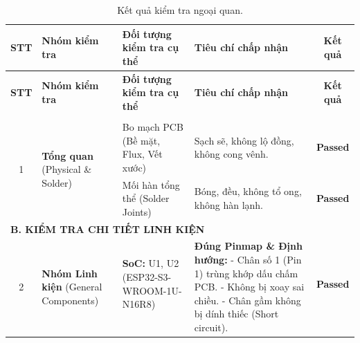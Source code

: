         \begin{longtable}{|c|p{2.5cm}|p{5cm}|p{4cm}|c|}
            \caption{Kết quả kiểm tra ngoại quan.}
            \label{tab:visual_inspection} \\
            \hline
            \textbf{STT} & \textbf{Nhóm kiểm tra} & \textbf{Đối tượng kiểm tra cụ thể} & \textbf{Tiêu chí chấp nhận} & \textbf{Kết quả} \\ \hline
            \endfirsthead
        
            \hline
            \textbf{STT} & \textbf{Nhóm kiểm tra} & \textbf{Đối tượng kiểm tra cụ thể} & \textbf{Tiêu chí chấp nhận} & \textbf{Kết quả} \\ \hline
            \endhead
        
            \hline
            \endfoot
            \endlastfoot
        
            \multicolumn{5}{|l|}{\textbf{A. KIỂM TRA TỔNG QUÁT}} \\ \hline
        
            \multirow{2}{*}{1} & \multirow{2}{3cm}{\textbf{Tổng quan} \newline (Physical \& Solder)}
                & Bo mạch PCB (Bề mặt, Flux, Vết xước) 
                & Sạch sẽ, không lộ đồng, không cong vênh. 
                & \textcolor{modern_blue}{\textbf{Passed}} \\ \cline{3-5}
        
                & & Mối hàn tổng thể (Solder Joints) 
                & Bóng, đều, không tổ ong, không hàn lạnh. 
                & \textcolor{modern_blue}{\textbf{Passed}} \\ \hline
        
            \multicolumn{5}{|l|}{\textbf{B. KIỂM TRA CHI TIẾT LINH KIỆN}} \\ \hline
        
            \multirow{15}{*}{2} & \multirow{15}{3cm}{\textbf{Nhóm Linh kiện} \newline (General Components)}
                & \textbf{SoC:} U1, U2 \newline (ESP32-S3-WROOM-1U-N16R8)
                & \multirow{15}{4cm}{\textbf{Đúng Pinmap \& Định hướng:} \newline - Chân số 1 (Pin 1) trùng khớp dấu chấm PCB. \newline - Không bị xoay sai chiều. \newline - Chân gầm không bị dính thiếc (Short circuit).}
                & \textcolor{modern_blue}{\textbf{Passed}} \\ \cline{3-3} \cline{5-5}
        

\end{longtable}
